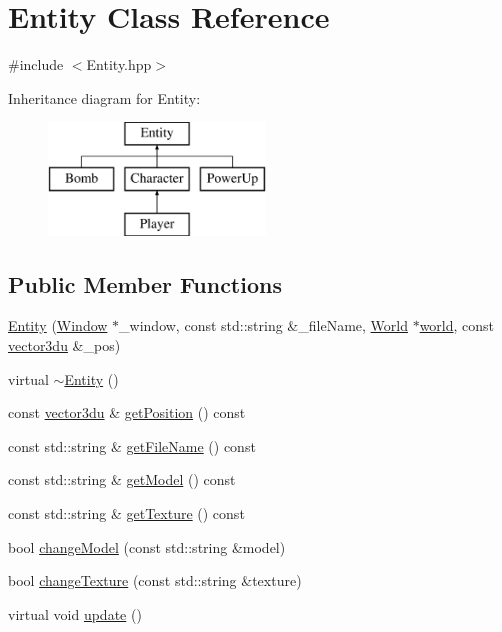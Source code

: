 \hypertarget{class_entity}{}\section{Entity Class Reference}
\label{class_entity}


{\ttfamily \#include $<$Entity.\+hpp$>$}

Inheritance diagram for Entity\+:\begin{figure}[H]
\begin{center}
\leavevmode
\includegraphics[height=3.000000cm]{class_entity}
\end{center}
\end{figure}
\subsection*{Public Member Functions}
\begin{DoxyCompactItemize}
\item 
\mbox{\hyperlink{class_entity_a3aa7f1038f236833533a55440eb35a49}{Entity}} (\mbox{\hyperlink{class_window}{Window}} $\ast$\+\_\+window, const std\+::string \&\+\_\+file\+Name, \mbox{\hyperlink{class_world}{World}} $\ast$\mbox{\hyperlink{class_entity_a038b06c38fe6bb385f37c05a5647c0dc}{world}}, const \mbox{\hyperlink{_utility_8hpp_ac675fa2b6c79d0be47ae76e5d0ce38a8}{vector3du}} \&\+\_\+pos)
\item 
virtual \mbox{\hyperlink{class_entity_adf6d3f7cb1b2ba029b6b048a395cc8ae}{$\sim$\+Entity}} ()
\item 
const \mbox{\hyperlink{_utility_8hpp_ac675fa2b6c79d0be47ae76e5d0ce38a8}{vector3du}} \& \mbox{\hyperlink{class_entity_a7290deb888c80712ed57aa332f0c78e0}{get\+Position}} () const
\item 
const std\+::string \& \mbox{\hyperlink{class_entity_acd53c0e6262c3ca14e16358cb2108edc}{get\+File\+Name}} () const
\item 
const std\+::string \& \mbox{\hyperlink{class_entity_afae2e0444ed61facc55756887d725208}{get\+Model}} () const
\item 
const std\+::string \& \mbox{\hyperlink{class_entity_a22955fbd8023631114a0a37189ad182b}{get\+Texture}} () const
\item 
bool \mbox{\hyperlink{class_entity_a7af4a2f9d919f516d67be4d22a648cae}{change\+Model}} (const std\+::string \&model)
\item 
bool \mbox{\hyperlink{class_entity_a4195b26c19b8c13e66f6bf723185d9ec}{change\+Texture}} (const std\+::string \&texture)
\item 
virtual void \mbox{\hyperlink{class_entity_a00b6eeaf99b35c8f8b10b5fbfc1baf4f}{update}} ()
\end{DoxyCompactItemize}
